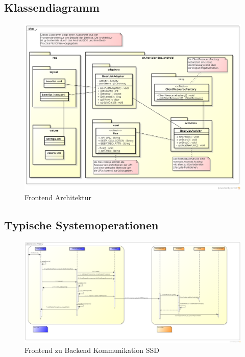 \documentclass[10pt,a4paper]{scrartcl}
\begin{document}
\subsection{Klassendiagramm}
\begin{figure}[H]
	\includegraphics[height=0.9\textwidth,angle=90]{FrontendArchitektur.png}
	\caption{Frontend Architektur}
	\label{fig:frontend_architecture}
\end{figure}

\subsection{Typische Systemoperationen}
\begin{figure}[H]
	\includegraphics[height=0.8\textwidth,angle=90]{BeerlistSSD.png}
	\caption{Frontend zu Backend Kommunikation SSD}
	\label{fig:beerlist_ssd}
\end{figure}
\end{document}
